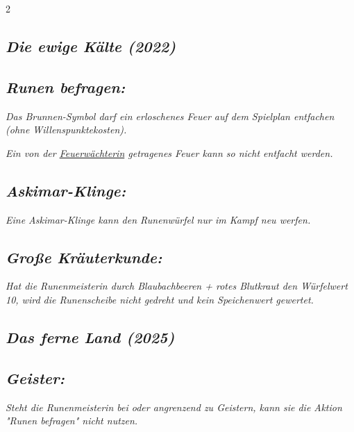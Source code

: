 \documentclass[10pt, a4paper, oneside]{book}
\newcommand{\fan}[1]{\textit{#1}}
\begin{document}
\begin{multicols*}{2}
\begin{bgcolor}[color-dz]
\end{bgcolor}

\begin{bgcolor}
\section{\fan{Die ewige Kälte (2022)}}

\subsection{\fan{Runen befragen:}}


\fan{Das Brunnen-Symbol darf ein erloschenes Feuer auf dem Spielplan entfachen (ohne Willenspunktekosten).}


\fan{Ein von der \hyperref[feuerwaechterin]{Feuerwächterin} getragenes Feuer kann so nicht entfacht werden.}



\subsection{\fan{Askimar-Klinge:}}

\fan{Eine Askimar-Klinge kann den Runenwürfel nur im Kampf neu werfen.}



\subsection{\fan{Große Kräuterkunde:}}

\fan{Hat die Runenmeisterin durch Blaubachbeeren + rotes Blutkraut den Würfelwert 10, wird die Runenscheibe nicht gedreht und kein Speichenwert gewertet. }

\end{bgcolor}






\begin{bgcolor}
\section{\fan{Das ferne Land (2025)}}



\subsection{\fan{Geister:}}

\fan{Steht die Runenmeisterin bei oder angrenzend zu Geistern, kann sie die Aktion "Runen befragen" nicht nutzen.}


\end{bgcolor}
\end{multicols*}
\end{document}
